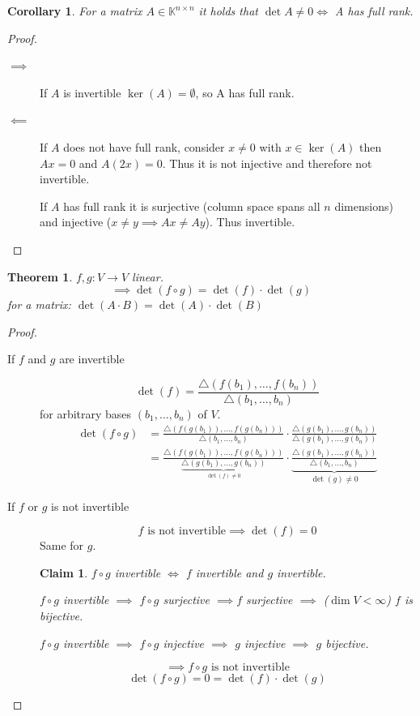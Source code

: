 \documentclass{article}
\newtheorem{theorem}{Theorem}  \numberwithin{theorem}{section}
\newtheorem*{claim}{Claim}%
\newtheorem{corollary}{Corollary}  \numberwithin{corollary}{section}
\begin{document}
\begin{corollary}
  For a matrix $A \in \mathbb K^{n\times n}$ it holds that $\det{A} \neq 0 \iff$ A has full rank.
\end{corollary}

\begin{proof}
  \begin{description}
    \item[$\implies$]
      If $A$ is invertible $\ker(A) = \emptyset$, so A has full rank.
    \item[$\impliedby$] 
      If $A$ does not have full rank, consider $x \neq 0$ with $x \in \operatorname{ker}(A)$ then $Ax = 0$ and $A(2x) = 0$. Thus it is not injective and therefore not invertible.

      If $A$ has full rank it is surjective (column space spans all $n$ dimensions) and injective ($x \neq y \implies Ax \neq Ay$). Thus invertible.
  \end{description}
\end{proof}

\begin{theorem} %
  $f, g: V \to V$ linear.
  \[ \implies \det(f \circ g) = \det(f) \cdot \det(g) \]
  for a matrix: $\det(A \cdot B) = \det(A) \cdot \det(B)$
\end{theorem}

\begin{proof}
  \begin{description}
    \item[If $f$ and $g$ are invertible] 
      \[ \det(f) = \frac{\triangle (f(b_1), \dots, f(b_n))}{\triangle(b_1, \dots, b_n)} \]
      for arbitrary bases $(b_1, \dots, b_n)$ of $V$.
      \begin{align*}
        \det(f \circ g) &= \frac{\triangle(f(g(b_1)), \dots, f(g(b_n)))}{\triangle(b_1, \dots, b_n)} \cdot \frac{\triangle(g(b_1), \dots, g(b_n))}{\triangle(g(b_1), \dots, g(b_n))} \\
          &= \frac{\triangle(f(g(b_1)), \dots, f(g(b_n)))}{\underbrace{\triangle(g(b_1), \dots, g(b_n))}_{\det(f) \neq 0}} \cdot \underbrace{\frac{\triangle(g(b_1), \dots, g(b_n))}{\triangle(b_1, \dots, b_n)}}_{\det(g) \neq 0}
      \end{align*}
    \item[If $f$ or $g$ is not invertible]
      \[ f \text{ is not invertible} \implies \det(f) = 0 \]
      Same for $g$.

      \begin{claim}
        $f \circ g$ invertible $\iff$ $f$ invertible and $g$ invertible.

        $f \circ g$ invertible $\implies$ $f \circ g$ surjective $\implies f$ surjective $\implies$ ($\dim{V} < \infty$) $f$ is bijective.

        $f \circ g$ invertible $\implies$ $f \circ g$ injective $\implies$ $g$ injective $\implies$ $g$ bijective.
      \end{claim}

      \[ \implies f \circ g \text{ is not invertible} \]
      \[ \det(f \circ g) = 0 = \det(f) \cdot \det(g) \]
  \end{description}
\end{proof}
\end{document}
